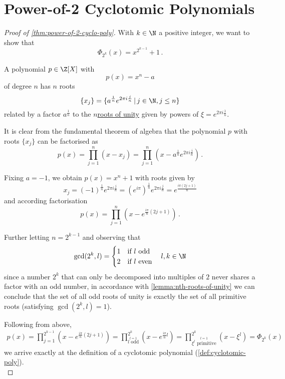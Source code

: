 \section{Power-of-2 Cyclotomic Polynomials}
\label{proof:power-of-2-cyclo-poly}
\begin{proof}[Proof of \cref{thm:power-of-2-cyclo-poly}]
  With $k \in \N$ a positive integer, we want to show that
  $$\Phi_{2^k} (x) = x^{2^{k-1}} + 1\,.$$

  A polynomial $p \in \Z[X]$ with $$p(x) = x^n - a$$ of degree $n$ has $n$ roots
  $$\{x_j\} = \{a^\frac{1}{n} e^{2\pi i \frac{j}{n}} \,|\, j \in \N, j \leq n\}$$
  related by a factor $a^\frac{1}{n}$ to the \hyperref[lemma:nth-roots-of-unity]{$n$\th roots of unity} given by powers of $\xi = e^{2\pi i \frac{1}{n}}$.

  It is clear from the fundamental theorem of algebra that the polynomial $p$ with roots $\{x_j\}$ can be factorised as
  $$p(x) = \prod_{j=1}^{n} (x - x_j) = \prod_{j=1}^{n} (x - a^\frac{1}{n} e^{2\pi i \frac{j}{n}})\,.$$

  Fixing $a = -1$, we obtain $p(x) = x^n + 1$ with roots given by
  $$x_j = (-1)^\frac{1}{n} e^{2\pi i \frac{j}{n}}
    = (e^{i\pi})^\frac{1}{n} e^{2\pi i \frac{j}{n}}
    = e^{\frac{i\pi (2j + 1)}{n}}$$
  and according factorisation
  $$p(x) = \prod_{j=1}^{n} (x - e^{\frac{i\pi}{n} (2j + 1)})\,.$$

  Further letting $n = 2^{k-1}$ and observing that
  $$\gcd(2^k, l) = \begin{cases}
      1 & \text{if } l \text{ odd}  \\
      2 & \text{if } l \text{ even}
    \end{cases} \quad l, k \in \N$$
  since a number $2^k$ that can only be decomposed into multiples of $2$
  never shares a factor with an odd number, in accordance with \cref{lemma:nth-roots-of-unity}
  we can conclude that the set of all odd roots of unity is exactly the set of all primitive roots (satisfying $\gcd(2^k, l) = 1$).

  Following from above,
  \begin{align*}
    p(x) = \prod_{j=1}^{2^{k-1}} (x - e^{\frac{i\pi}{n} (2j + 1)})
    = \prod_{\stackrel{l=1}{l \text{ odd}}}^{2^k} (x - e^{\frac{i\pi}{n} l})
    = \prod_{\stackrel{l=1}{\xi^l \text{ primitive}}}^{2^k} (x - \xi^l)
    = \Phi_{2^k}(x)
  \end{align*}
  we arrive exactly at the definition of a cyclotomic polynomial (\cref{def:cyclotomic-poly}). \\
  \parencite{power-of-2-cyclo-poly}
\end{proof}

